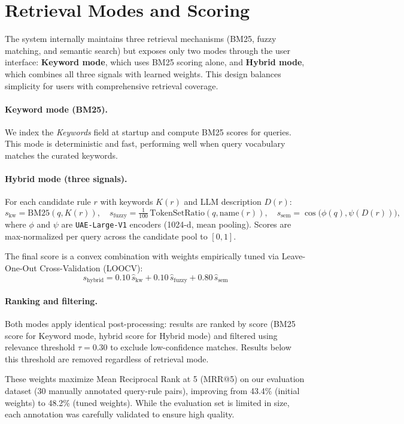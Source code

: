\section{Retrieval Modes and Scoring}

The system internally maintains three retrieval mechanisms (BM25, fuzzy matching, and semantic search) but exposes only two modes through the user interface: \textbf{Keyword mode}, which uses BM25 scoring alone, and \textbf{Hybrid mode}, which combines all three signals with learned weights. This design balances simplicity for users with comprehensive retrieval coverage.

\paragraph{Keyword mode (BM25).} 
We index the \emph{Keywords} field at startup and compute BM25 scores for queries. This mode is deterministic and fast, performing well when query vocabulary matches the curated keywords.

\paragraph{Hybrid mode (three signals).} 
For each candidate rule $r$ with keywords $K(r)$ and LLM description $D(r)$:
\[
s_{\text{kw}} = \mathrm{BM25}(q, K(r)),\quad s_{\text{fuzzy}} = \tfrac{1}{100}\,\mathrm{TokenSetRatio}(q, \mathrm{name}(r)),\quad s_{\text{sem}} = \cos\!\big(\phi(q), \psi(D(r))\big),
\]
where $\phi$ and $\psi$ are \texttt{UAE-Large-V1} encoders (1024-d, mean pooling). Scores are max-normalized per query across the candidate pool to $[0,1]$. 

The final score is a convex combination with weights empirically tuned via Leave-One-Out Cross-Validation (LOOCV):
\[
s_{\text{hybrid}} = 0.10\,\widehat{s}_{\text{kw}} + 0.10\,\widehat{s}_{\text{fuzzy}} + 0.80\,\widehat{s}_{\text{sem}}
\]

\paragraph{Ranking and filtering.}
Both modes apply identical post-processing: results are ranked by score (BM25 score for Keyword mode, hybrid score for Hybrid mode) and filtered using relevance threshold $\tau = 0.30$ to exclude low-confidence matches. Results below this threshold are removed regardless of retrieval mode.

These weights maximize Mean Reciprocal Rank at 5 (MRR@5) on our evaluation dataset (30 manually annotated query-rule pairs), improving from 43.4\% (initial weights) to 48.2\% (tuned weights). While the evaluation set is limited in size, each annotation was carefully validated to ensure high quality.

